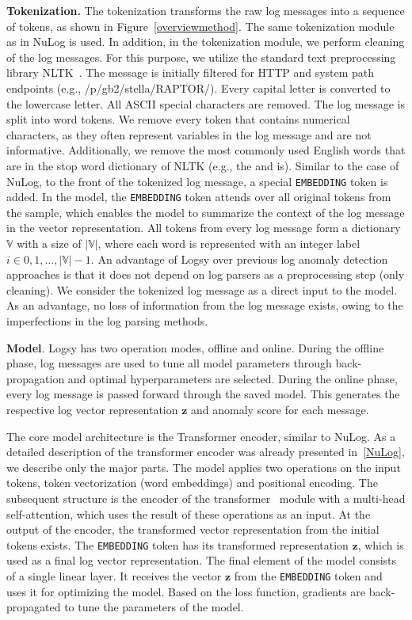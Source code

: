\textbf{Tokenization.} The tokenization transforms the raw log messages into a sequence of tokens, as shown in Figure~\ref{overviewmethod}. The same tokenization module as in NuLog is used. In addition, in the tokenization module, we perform cleaning of the log messages. For this purpose, we utilize the standard text preprocessing library NLTK~\cite{loper2002nltk}. The message is initially filtered for HTTP and system path endpoints (e.g., /p/gb2/stella/RAPTOR/). Every capital letter is converted to the lowercase letter. All ASCII special characters are removed. The log message is split into word tokens. We remove every token that contains numerical characters, as they often represent variables in the log message and are not informative. Additionally, we remove the most commonly used English words that are in the stop word dictionary of NLTK (e.g., the and is). Similar to the case of NuLog, to the front of the tokenized log message, a special \texttt{EMBEDDING} token is added. In the model, the \texttt{EMBEDDING} token attends over all original tokens from the sample, which enables the model to summarize the context of the log message in the vector representation. All tokens from every log message form a dictionary $\mathbb{V}$ with a size of $|\mathbb{V}|$, where each word is represented with an integer label $i \in {0, 1, \dots,|\mathbb{V}|-1}$. An advantage of Logsy over previous log anomaly detection approaches is that it does not depend on log parsers as a preprocessing step (only cleaning). We consider the tokenized log message as a direct input to the model. As an advantage, no loss of information from the log message exists, owing to the imperfections in the log parsing methods.

\textbf{Model}. Logsy has two operation modes, offline and online. During the offline phase, log messages are used to tune all model parameters through back-propagation and optimal hyperparameters are selected. During the online phase, every log message is passed forward through the saved model. This generates the respective log vector representation $\mathbf{z}$ and anomaly score for each message.

The core model architecture is the Transformer encoder, similar to NuLog. As a detailed description of the transformer encoder was already presented in~\autoref{NuLog}, we describe only the major parts.
The model applies two operations on the input tokens, token vectorization (word embeddings) and positional encoding. The subsequent structure is the encoder of the transformer~\cite{vaswani2017attention} module with a multi-head self-attention, which uses the result of these operations as an input. 
At the output of the encoder, the transformed vector representation from the initial tokens exists. The \texttt{EMBEDDING} token has its transformed representation $\mathbf{z}$, which is used as a final log vector representation.
The final element of the model consists of a single linear layer. It receives the vector $\mathbf{z}$ from the \texttt{EMBEDDING} token and uses it for optimizing the model. Based on the loss function, gradients are back-propagated to tune the parameters of the model. 

